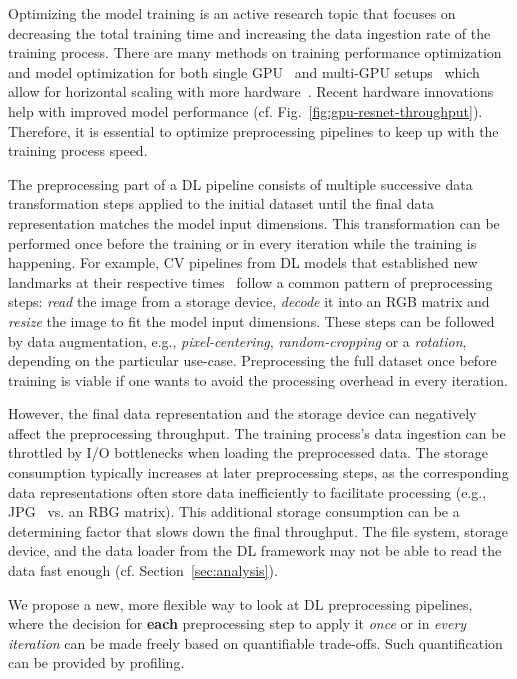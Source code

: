 Optimizing the model training is an active research topic that focuses on decreasing the total training time and increasing the data ingestion rate of the training process.
There are many methods on training performance optimization and model optimization for both single GPU~\cite{micikevicius2017mixed,vanholder2016efficient,han2015deep} and multi-GPU setups~\cite{jager2018parallelized,sergeev2018horovod,Jia2019,ren2019performance} which allow for horizontal scaling with more hardware~\cite{nvidiabenchmarks2020}.
Recent hardware innovations help with improved model performance (cf. Fig.~\ref{fig:gpu-resnet-throughput}).
Therefore, it is essential to optimize preprocessing pipelines to keep up with the training process speed.

The preprocessing part of a DL pipeline consists of multiple successive data transformation steps applied to the initial dataset until the final data representation matches the model input dimensions.
This transformation can be performed once before the training or in every iteration while the training is happening.
For example, CV pipelines from DL models that established new landmarks at their respective times~\cite{krizhevsky2012imagenet,zeiler2013visualizing,Simonyan15,he2016deep,szegedy2015rethinking} follow a common pattern of preprocessing steps: \textit{read} the image from a storage device, \textit{decode} it into an RGB matrix and \textit{resize} the image to fit the model input dimensions. 
These steps can be followed by data augmentation, e.g., \textit{pixel-centering}, \textit{random-cropping} or a \textit{rotation}, depending on the particular use-case.
Preprocessing the full dataset once before training is viable if one wants to avoid the processing overhead in every iteration.

However, the final data representation and the storage device can negatively affect the preprocessing throughput.
The training process's data ingestion can be throttled by I/O bottlenecks when loading the preprocessed data.
The storage consumption typically increases at later preprocessing steps, as the corresponding data representations often store data inefficiently to facilitate processing (e.g., JPG~\cite{wallace1992jpeg} vs. an RBG matrix).
This additional storage consumption can be a determining factor that slows down the final throughput. The file system, storage device, and the data loader from the DL framework may not be able to read the data fast enough (cf. Section~\ref{sec:analysis}).

We propose a new, more flexible way to look at DL preprocessing pipelines, where the decision for \textbf{each} preprocessing step to apply it \textit{once} or in \textit{every iteration} can be made freely based on quantifiable trade-offs.
Such quantification can be provided by profiling.

